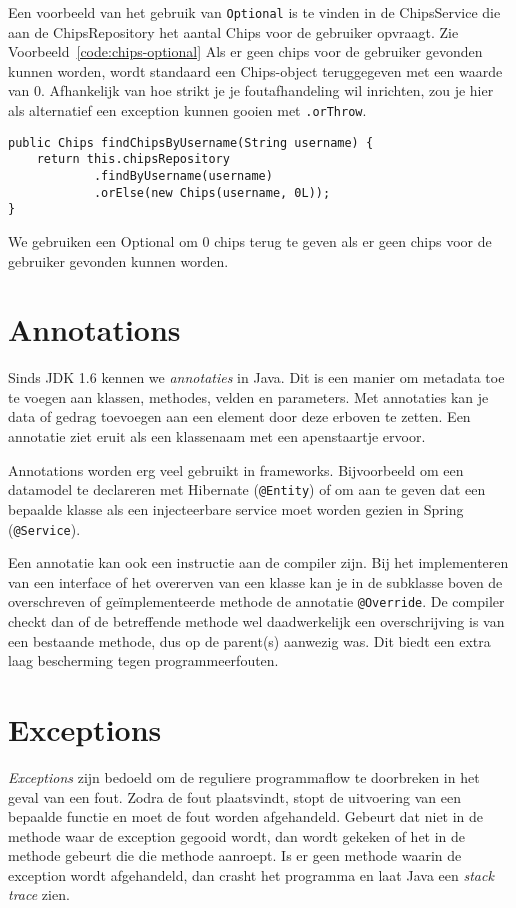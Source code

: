 Een voorbeeld van het gebruik van \texttt{Optional} is te vinden in de ChipsService
die aan de ChipsRepository het aantal Chips voor de gebruiker opvraagt. Zie Voorbeeld~\ref{code:chips-optional}
Als er geen chips voor de gebruiker gevonden kunnen worden, wordt standaard een Chips-object teruggegeven met een waarde van 0.
Afhankelijk van hoe strikt je je foutafhandeling wil inrichten,
zou je hier als alternatief een exception kunnen gooien met \texttt{.orThrow}.

\begin{listing}[H]
\begin{verbatim}
public Chips findChipsByUsername(String username) {
    return this.chipsRepository
            .findByUsername(username)
            .orElse(new Chips(username, 0L));
}
\end{verbatim}
\caption{We gebruiken een Optional om 0 chips terug te geven als er geen chips voor de gebruiker gevonden kunnen worden.}
\label{code:chips-optional}
\end{listing}

\section{Annotations}
Sinds JDK 1.6 kennen we \textit{annotaties} in Java. 
Dit is een manier om metadata toe te voegen aan klassen,
methodes, velden en parameters. Met annotaties kan je 
data of gedrag toevoegen aan een element door deze erboven te 
zetten. Een annotatie ziet eruit als een klassenaam met een apenstaartje ervoor.

Annotations worden erg veel gebruikt in frameworks. Bijvoorbeeld
om een datamodel te declareren met Hibernate (\texttt{@Entity})
of om aan te geven dat een bepaalde klasse als een injecteerbare 
service moet worden gezien in Spring (\texttt{@Service}).

Een annotatie kan ook een instructie aan de compiler zijn.
Bij het implementeren van een interface of het overerven van een klasse 
kan je in de subklasse boven de overschreven of geïmplementeerde methode 
de annotatie \texttt{@Override}. De compiler checkt dan of de betreffende
methode wel daadwerkelijk een overschrijving is van een bestaande methode,
dus op de parent(s) aanwezig was. Dit biedt een extra laag bescherming tegen 
programmeerfouten.

\section{Exceptions}
\textit{Exceptions} zijn bedoeld om de reguliere programmaflow
te doorbreken in het geval van een fout. Zodra de fout plaatsvindt, 
stopt de uitvoering van een bepaalde functie en moet de fout worden afgehandeld.
Gebeurt dat niet in de methode waar de exception gegooid wordt, dan wordt gekeken 
of het in de methode gebeurt die die methode aanroept. Is er geen methode waarin 
de exception wordt afgehandeld, dan crasht het programma en laat Java een 
\textit{stack trace} zien.

